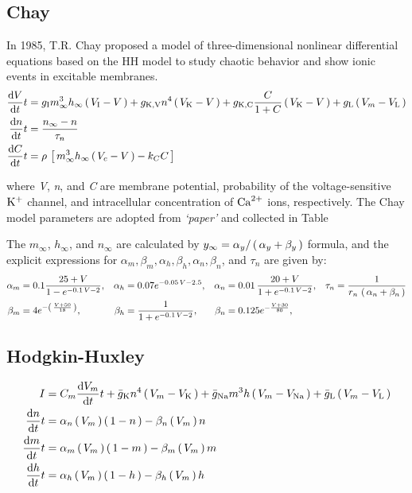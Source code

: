 \documentclass[../../Orator.tex]{subfiles}
\begin{document}
\subsection{Chay}
In 1985, T.R. Chay proposed a model of three-dimensional nonlinear differential equations based on the HH model to study chaotic behavior and show ionic events in excitable membranes. 
\begin{subequations}\label{eq:ChaySys}
    \begin{align}
        \ode{V}{t} &= g_\rmm{I}  m^3_\infty h_\infty \br{V_\rmm{I} - V} + g_\rmm{K, V} n^4 \br{V_\rmm{K} - V} + g_\rmm{K, C}  \frac{C}{1+C}\br{V_\rmm{K} - V} + g_\rmm{L} \br{V_m - V_\rmm{L}} \\ 
        \ode{n}{t} &= \frac{n_\infty - n}{\tau_n} \\
        \ode{C}{t} &= \rho \, \sbr{m^3_\infty h_\infty \br{V_c - V} - k_C C}
    \end{align}
\end{subequations}

where \textit{V}, \textit{n}, and \textit{C} are membrane potential, probability of the voltage-sensitive \(\mathrm{K}^+\) channel, and intracellular concentration of \(\mathrm{Ca}^{2+}\) ions, respectively. The Chay model parameters are adopted from \textit{`paper'} and collected in Table

The \(m_\infty\), \(h_\infty\), and \(n_\infty\) are calculated by \(y_\infty = \alpha_y / \br{\alpha_y + \beta_y} \) formula, and the explicit expressions for 
\(\alpha_m, \beta_m, \alpha_h, \beta_h, \alpha_n, \beta_n\), and \(\tau_n\) are given by:
\begin{align*}
    \alpha_m &= 0.1 \frac{ 25 + V }{1 - e^{-0.1 \, V - 2}}, &
    \alpha_h &=  0.07 e^{-0.05\,V -2.5}, &
    \alpha_n &= 0.01 \, \frac{ 20 + V }{ 1 + e^{-0.1 \, V - 2}}, &
    \tau_n &= \frac{1}{ r_n \, \br{\alpha_n + \beta_n} } \\
    \beta_m  &= 4 e^{-\br{\frac{ V + 50 }{ 18 } } }, &
    \beta_h  &= \frac{ 1 }{ 1 + e^{-0.1 \, V - 2}}, &
    \beta_n  &= 0.125 e^{- \frac{V + 30}{80}}, &
\end{align*}




\subsection{Hodgkin-Huxley}
\begin{subequations}\label{eq:HodHuxSys}
    \begin{align}
        I &= C_m \ode{V_m}{t} + \bar{g}_\rmm{K} n^4 \br{V_m - V_\rmm{K}} + \bar{g}_\rmm{Na} m^3 h \br{V_m - V_\rmm{Na}}  + \bar{g}_\rmm{L} \br{V_m - V_\rmm{L}} \\
        \ode{n}{t} &= \alpha_n \br{V_m} \br{1-n} - \beta_n \br{V_m} n \\
        \ode{m}{t} &= \alpha_m \br{V_m} \br{1-m} - \beta_m \br{V_m} m \\
        \ode{h}{t} &= \alpha_h \br{V_m} \br{1-h} - \beta_h \br{V_m} h 
    \end{align}
\end{subequations}
\end{document}
